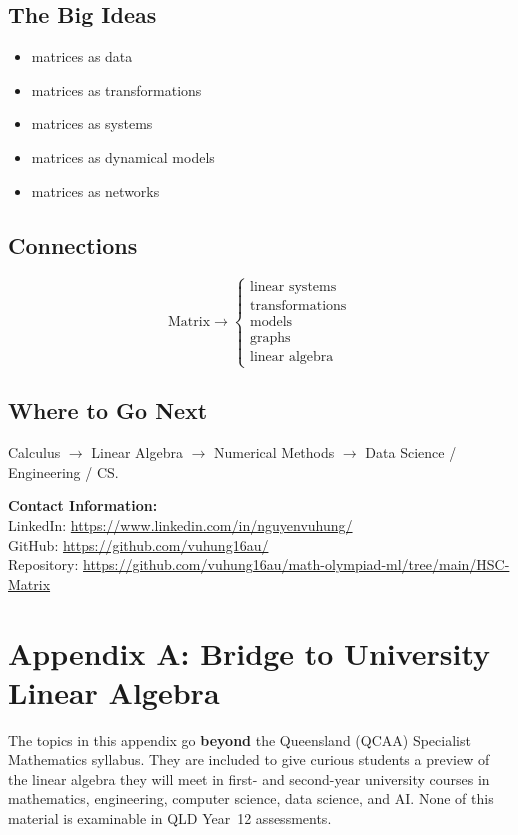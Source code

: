 \documentclass[12pt]{article}
\begin{document}
\subsection*{The Big Ideas}
\begin{itemize}
    \item matrices as data
    \item matrices as transformations
    \item matrices as systems
    \item matrices as dynamical models
    \item matrices as networks
\end{itemize}

\subsection*{Connections}
\[
\boxed{\text{Matrix}}
\rightarrow
\begin{cases}
\text{linear systems}\\
\text{transformations}\\
\text{models}\\
\text{graphs}\\
\text{linear algebra}
\end{cases}
\]

\subsection*{Where to Go Next}
Calculus $\rightarrow$ Linear Algebra $\rightarrow$ Numerical Methods $\rightarrow$ Data Science / Engineering / CS.

\vspace{2em}
\noindent\textbf{Contact Information:}\\[0.5em]
LinkedIn: \href{https://www.linkedin.com/in/nguyenvuhung/}{https://www.linkedin.com/in/nguyenvuhung/}\\[0.3em]
GitHub: \href{https://github.com/vuhung16au/}{https://github.com/vuhung16au/}\\[0.3em]
Repository: \href{https://github.com/vuhung16au/math-olympiad-ml/tree/main/HSC-Matrix}{https://github.com/vuhung16au/math-olympiad-ml/tree/main/HSC-Matrix}

\newpage
\appendix
\section{Appendix A: Bridge to University Linear Algebra}

\begin{remarkbox}[title={\bfseries Enrichment Material}]
The topics in this appendix go \textbf{beyond} the Queensland (QCAA) Specialist Mathematics syllabus. They are included to give curious students a preview of the linear algebra they will meet in first- and second-year university courses in mathematics, engineering, computer science, data science, and AI. None of this material is examinable in QLD Year~12 assessments.
\end{remarkbox}
\end{document}
